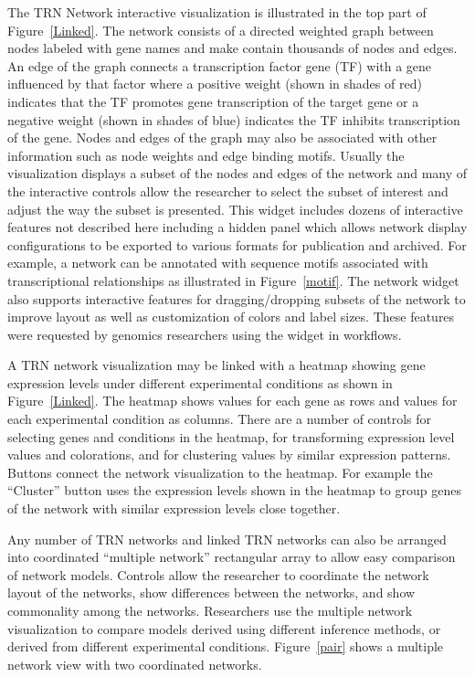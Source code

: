 \documentclass[10pt,letterpaper]{article}
\begin{document}
The TRN Network interactive visualization is illustrated in the top part of Figure~\ref{Linked}. 
The network consists of a directed weighted graph between nodes labeled with gene names 
and make contain thousands of nodes and edges.  An edge of the graph connects a transcription 
factor gene (TF) with a gene influenced by that factor where a positive weight (shown in shades of red) 
indicates that the TF promotes gene transcription of the target gene or a negative weight (shown in shades of blue)
indicates the TF inhibits transcription of the gene. Nodes and edges of the graph may also be
associated with other information such as node weights and edge binding motifs.  Usually the 
visualization displays a subset of the nodes and edges of the network and many of the 
interactive controls allow the researcher to select the subset of interest and adjust the way 
the subset is presented.  This widget includes dozens of interactive features not described here 
including a hidden panel which allows network display configurations to be exported to various 
formats for publication and archived.  For example, a network can be annotated with sequence motifs 
\cite{motif} associated with transcriptional relationships as illustrated in Figure~\ref{motif}.  
The network widget also supports interactive features for dragging/dropping subsets of the network
to improve layout as well as customization of colors and label sizes.  These features 
were requested by genomics researchers using the widget in workflows.

A TRN network visualization may be linked with a heatmap showing gene expression 
levels under different experimental conditions as shown in Figure~\ref{Linked}.  
The heatmap shows values for each gene as rows and values for each experimental condition as columns.  
There are a number of controls for selecting genes and conditions in the heatmap, for transforming expression 
level values and colorations, and for clustering values by similar expression patterns.
Buttons connect the network visualization to the heatmap.  For example the “Cluster” button uses the expression 
levels shown in the heatmap to group genes of the network with similar expression levels close together.

Any number of TRN networks and linked TRN networks can also be arranged into coordinated 
“multiple network” rectangular array to allow easy comparison of network models.  
Controls allow the researcher to coordinate the network layout of the networks, show differences 
between the networks, and show commonality among the networks.  
Researchers use the multiple network visualization to compare models derived using 
different inference methods, or derived from different experimental conditions.  
Figure~\ref{pair} shows a multiple network view with two coordinated networks.
\end{document}
